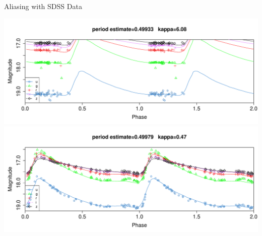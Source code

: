 \documentclass[12pt]{beamer}
\begin{document}

  
  



\begin{frame}{Aliasing with SDSS Data}

  \begin{center}
  \includegraphics[scale=0.3]{figs/alias_not_rr.pdf}\\
  \includegraphics[scale=0.3]{figs/alias_rr_rr.pdf}
  \end{center}
  
\end{frame}
\end{document}

